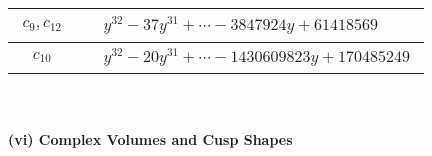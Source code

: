 \documentclass[1p]{elsarticle_modified}
\theoremstyle{definition}
\begin{document}
\begin{tabular}{m{50pt}|m{274pt}}
\hline $$\begin{aligned}c_{9},c_{12}\end{aligned}$$&$\begin{aligned}
&y^{32}-37 y^{31}+\cdots-3847924 y+61418569
\end{aligned}$\\
\hline $$\begin{aligned}c_{10}\end{aligned}$$&$\begin{aligned}
&y^{32}-20 y^{31}+\cdots-1430609823 y+170485249
\end{aligned}$\\
\hline
\end{tabular}\\~\\
\newpage\flushleft \textbf{(vi) Complex Volumes and Cusp Shapes}
\end{document}
